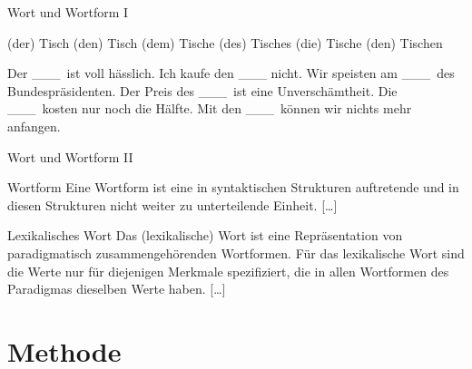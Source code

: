 \begin{frame}
  {Wort und Wortform I}
  \pause
  \begin{exe}
    \ex
    \begin{xlist}
      \ex (der) Tisch
      \pause
      \ex (den) Tisch
      \pause
      \ex (dem) Tisch\alert{e}
      \pause
      \ex (des) Tisch\alert{es}
      \pause
      \ex (die) Tisch\alert{e}
      \pause
      \ex (den) Tisch\alert{en}
    \end{xlist}
  \end{exe}
  \pause
  \begin{exe}
    \ex
    \begin{xlist}
      \ex Der \_\_\_\ ist voll hässlich.
      \pause
      \ex Ich kaufe den \_\_\_ nicht.
      \pause
      \ex Wir speisten am \_\_\_\ des Bundespräsidenten.
      \pause
      \ex Der Preis des \_\_\_\ ist eine Unverschämtheit.
      \pause
      \ex Die \_\_\_\ kosten nur noch die Hälfte.
      \pause
      \ex Mit den \_\_\_\ können wir nichts mehr anfangen.
    \end{xlist}
  \end{exe}
\end{frame}

\begin{frame}
  {Wort und Wortform II}
  \pause
  \begin{block}{Wortform}
    Eine Wortform ist eine in syntaktischen Strukturen auftretende und in diesen Strukturen nicht weiter zu unterteilende Einheit.
    [\ldots]
  \end{block}
  \Zeile
  \pause
  \begin{block}{Lexikalisches Wort}
    Das (\alert{lexikalische}) \alert{Wort} ist eine Repräsentation von paradigmatisch zusammengehörenden Wortformen.
    Für das lexikalische Wort sind die Werte nur für diejenigen Merkmale spezifiziert, die in allen Wortformen des Paradigmas dieselben Werte haben.
    [\ldots]
  \end{block}
\end{frame}

\section{Methode}


